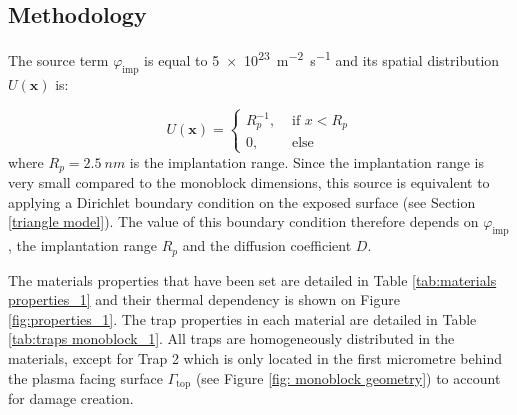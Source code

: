 


\subsection{Methodology}

The source term $\varphi_\mathrm{imp}$ is equal to \SI{5e23}{m^{-2}.s^{-1}} and its spatial distribution $U(\textbf{x})$ is:

\begin{equation}
    U(\textbf{x}) = \begin{cases}
    R_p^{-1},& \text{ if } x < R_p\\
    0,& \text{ else }
    \end{cases}
\end{equation}
where $R_p = \SI{2.5}{nm}$ is the implantation range.
Since the implantation range is very small compared to the monoblock dimensions, this source is equivalent to applying a Dirichlet boundary condition on the exposed surface (see Section \ref{triangle model}).
The value of this boundary condition therefore depends on $\varphi_\mathrm{imp}$, the implantation range $R_p$ and the diffusion coefficient $D$.


The materials properties that have been set are detailed in Table \ref{tab:materials properties_1} and their thermal dependency is shown on Figure \ref{fig:properties_1}.
The trap properties in each material are detailed in Table \ref{tab:traps monoblock_1}.
All traps are homogeneously distributed in the materials, except for Trap 2 which is only located in the first micrometre behind the plasma facing surface $\Gamma_\mathrm{top}$ (see Figure \ref{fig: monoblock geometry}) to account for damage creation.


